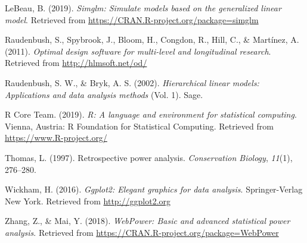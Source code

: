 \documentclass[man,mask,floatsintext]{apa6}
\begin{document}
\leavevmode\hypertarget{ref-simglm}{}%
LeBeau, B. (2019). \emph{Simglm: Simulate models based on the generalized linear model}. Retrieved from \url{https://CRAN.R-project.org/package=simglm}

\leavevmode\hypertarget{ref-optimal}{}%
Raudenbush, S., Spybrook, J., Bloom, H., Congdon, R., Hill, C., \& Martínez, A. (2011). \emph{Optimal design software for multi-level and longitudinal research}. Retrieved from \url{http://hlmsoft.net/od/}

\leavevmode\hypertarget{ref-raudenbush2002}{}%
Raudenbush, S. W., \& Bryk, A. S. (2002). \emph{Hierarchical linear models: Applications and data analysis methods} (Vol. 1). Sage.

\leavevmode\hypertarget{ref-rpro}{}%
R Core Team. (2019). \emph{R: A language and environment for statistical computing}. Vienna, Austria: R Foundation for Statistical Computing. Retrieved from \url{https://www.R-project.org/}

\leavevmode\hypertarget{ref-thomas1997}{}%
Thomas, L. (1997). Retrospective power analysis. \emph{Conservation Biology}, \emph{11}(1), 276--280.

\leavevmode\hypertarget{ref-ggplot2}{}%
Wickham, H. (2016). \emph{Ggplot2: Elegant graphics for data analysis}. Springer-Verlag New York. Retrieved from \url{http://ggplot2.org}

\leavevmode\hypertarget{ref-webpower}{}%
Zhang, Z., \& Mai, Y. (2018). \emph{WebPower: Basic and advanced statistical power analysis}. Retrieved from \url{https://CRAN.R-project.org/package=WebPower}

\endgroup
\end{document}

